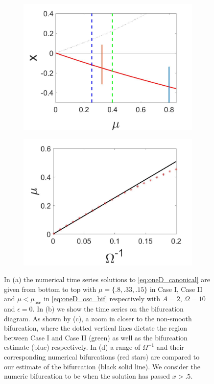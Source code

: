\begin{figure}[H]
\begin{subfigure}{.5\textwidth}
 \includegraphics[width=\linewidth]{oneD/osc_bif_diagram_zoom.jpg}
 \caption{}
\end{subfigure}%
\begin{subfigure}{.5\textwidth}
\centering
\includegraphics[width=\linewidth]{oneD/osc_Omegacomp.jpg}
\caption{}
\label{fig:oneD_osc_comp}
\end{subfigure}
\caption{In (a) the numerical time series solutions to \eqref{eq:oneD_canonical} are given from bottom to top with $\mu=\{.8,.33,.15\}$ in Case I, Case II and $\mu<\mu_{\text{osc}}$ in \eqref{eq:oneD_osc_bif} respectively with $A=2$, $\Omega=10$ and $\epsilon=0$. In (b) we show the time series on the bifurcation diagram. As shown by (c), a zoom in closer to the non-smooth bifurcation, where the dotted vertical lines dictate the region between Case I and Case II (green) as well as the bifurcation estimate (blue) respectively. In (d) a range of $\Omega^{-1}$ and their corresponding numerical bifurcations (red stars) are compared to our estimate of the bifurcation (black solid line). We consider the numeric bifurcation to be when the solution has passed $x>.5$.}
\label{fig:oneD_osc_numerics}
\end{figure}


